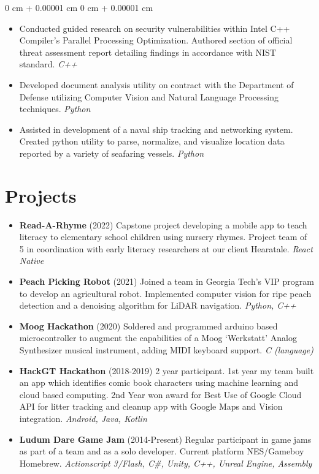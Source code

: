 \documentclass[10pt, letterpaper]{article}
\newenvironment{highlights}{
    \begin{itemize}[
        topsep=0.10 cm,
        parsep=0.10 cm,
        partopsep=0pt,
        itemsep=0pt,
        leftmargin=0 cm + 10pt
    ]
}{
    \end{itemize}
} %
\newenvironment{onecolentry}{
    \begin{adjustwidth}{
        0 cm + 0.00001 cm
    }{
        0 cm + 0.00001 cm
    }
}{
    \end{adjustwidth}
} %
\begin{document}
        \vspace{0.1 cm}
        
        \begin{onecolentry}
            \begin{highlights}
                \item Conducted guided research on security vulnerabilities within Intel C++ Compiler’s Parallel Processing Optimization. Authored section of official threat assessment report detailing findings in accordance with NIST standard. \textit{C++}
                \item Developed document analysis utility on contract with the Department of Defense utilizing Computer Vision and Natural Language Processing techniques. \textit{Python}
                \item Assisted in development of a naval ship tracking and networking system. Created python utility to parse, normalize, and visualize location data reported by a variety of seafaring vessels. \textit{Python}
            \end{highlights}
        \end{onecolentry}

        
    \section{Projects}
        \begin{highlights}
            \item \textbf{Read-A-Rhyme} (2022) Capstone project developing a mobile app to teach literacy to elementary school children using nursery rhymes. Project team of 5 in coordination with early literacy researchers at our client Hearatale. \textit{React Native}
            \item \textbf{Peach Picking Robot} (2021) Joined a team in Georgia Tech’s VIP program to develop an agricultural robot. Implemented computer vision for ripe peach detection and a denoising algorithm for LiDAR navigation. \textit{Python, C++}
            \item \textbf{Moog Hackathon} (2020) Soldered and programmed arduino based microcontroller to augment the capabilities of a Moog ‘Werkstatt’ Analog Synthesizer musical instrument, adding MIDI keyboard support. \textit{C (language)}
            \item \textbf{HackGT Hackathon} (2018-2019) 2 year participant. 1st year my team built an app which identifies comic book characters using machine learning and cloud based computing. 2nd Year won award for Best Use of Google Cloud API for litter tracking and cleanup app with Google Maps and Vision integration. \textit{Android, Java, Kotlin}
            \item \textbf{Ludum Dare Game Jam} (2014-Present) Regular participant in game jams as part of a team and as a solo developer. Current platform NES/Gameboy Homebrew. \textit{Actionscript 3/Flash, C\#, Unity, C++, Unreal Engine, Assembly}
        \end{highlights}
\end{document}
